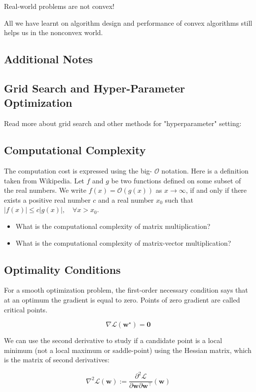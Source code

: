 Real-world problems are not convex!

All we have learnt on algorithm design and performance of convex algorithms still helps us in the nonconvex world.

\subsection*{Additional Notes}
\subsection*{Grid Search and Hyper-Parameter Optimization}
Read more about grid search and other methods for "hyperparameter" setting:


\subsection*{Computational Complexity}
The computation cost is expressed using the big- $\mathcal{O}$ notation. Here is a definition taken from Wikipedia. Let $f$ and $g$ be two functions defined on some subset of the real numbers. We write $f(x)=\mathcal{O}(g(x))$ as $x \rightarrow \infty$, if and only if there exists a positive real number $c$ and a real number $x_{0}$ such that $|f(x)| \leq c|g(x)|, \quad \forall x>x_{0}$.

\begin{itemize}
  \item What is the computational complexity of matrix multiplication?
  \item What is the computational complexity of matrix-vector multiplication?
\end{itemize}

\subsection*{Optimality Conditions}
For a smooth optimization problem, the first-order necessary condition says that at an optimum the gradient is equal to zero. Points of zero gradient are called critical points.

$$
\nabla \mathcal{L}\left(\mathbf{w}^{\star}\right)=\mathbf{0}
$$

We can use the second derivative to study if a candidate point is a local minimum (not a local maximum or saddle-point) using the Hessian
matrix, which is the matrix of second derivatives:

$$
\nabla^{2} \mathcal{L}(\mathbf{w}):=\frac{\partial^{2} \mathcal{L}}{\partial \mathbf{w} \partial \mathbf{w}^{\top}}(\mathbf{w})
$$

